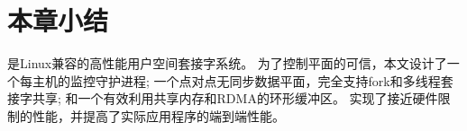 \section{本章小结}
\label{socksdirect:sec:conclusion}

\sys {}是Linux兼容的高性能用户空间套接字系统。
为了控制平面的可信，本文设计了一个每主机的监控守护进程;
一个点对点无同步数据平面，完全支持fork和多线程套接字共享;
和一个有效利用共享内存和RDMA的环形缓冲区。
\sys {}实现了接近硬件限制的性能，并提高了实际应用程序的端到端性能。


